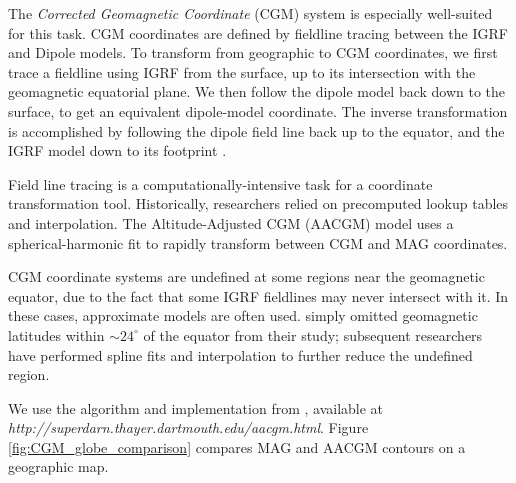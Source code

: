 The \emph{Corrected Geomagnetic Coordinate} (CGM) \citep{Hakura1965} system is especially well-suited for this task. CGM coordinates are defined by fieldline tracing between the IGRF and Dipole models. To transform from geographic to CGM coordinates, we first trace a fieldline using IGRF from the surface, up to its intersection with the geomagnetic equatorial plane. We then follow the dipole model back down to the surface, to get an equivalent dipole-model coordinate. The inverse transformation is accomplished by following the dipole field line back up to the equator, and the IGRF model down to its footprint \citep{Laundal2016}.

Field line tracing is a computationally-intensive task for a coordinate transformation tool. Historically, researchers relied on precomputed lookup tables and interpolation. The Altitude-Adjusted CGM (AACGM) model \citep{Baker1989, Shepherd2014} uses a spherical-harmonic fit to rapidly transform between CGM and MAG coordinates.

CGM coordinate systems are undefined at some regions near the geomagnetic equator, due to the fact that some IGRF fieldlines may never intersect with it. In these cases, approximate models are often used. \cite{Baker1989} simply omitted geomagnetic latitudes within $\sim 24^\circ$ of the equator from their study; subsequent researchers have performed spline fits and interpolation to further reduce the undefined region.

We use the algorithm and implementation from \cite{Shepherd2014}, available at \emph{http://superdarn.thayer.dartmouth.edu/aacgm.html}. Figure \ref{fig:CGM_globe_comparison} compares MAG and AACGM contours on a geographic map.





